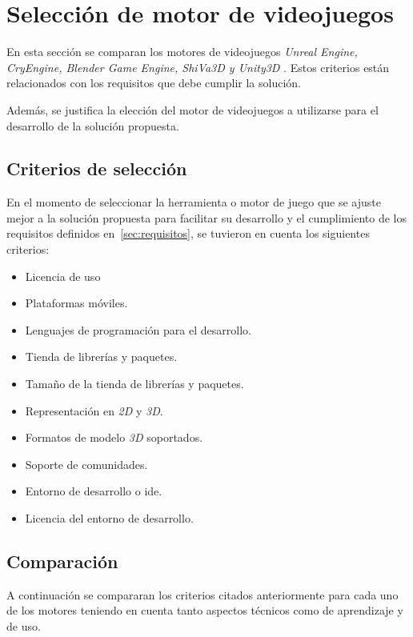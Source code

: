 \section{Selección de motor de videojuegos}
\label{sec:seleccion_plataforma}

En esta sección se comparan los motores de videojuegos \textit{Unreal Engine,
    CryEngine, Blender Game Engine, ShiVa3D y Unity3D} . Estos criterios están relacionados con los requisitos que debe
cumplir la solución.

Además, se justifica la elección del motor de videojuegos a utilizarse para 
el desarrollo de la solución propuesta.

\subsection{Criterios de selección}

En el momento de seleccionar la herramienta o motor de juego que se ajuste mejor
a la solución propuesta para facilitar su desarrollo y el cumplimiento de los
requisitos definidos en~\ref{sec:requisitos}, se tuvieron en cuenta los
siguientes criterios:

\begin{itemize}
\item Licencia de uso
\item Plataformas móviles.
\item Lenguajes de programación para el desarrollo.
\item Tienda de librerías y paquetes.
\item Tamaño de la tienda de librerías y paquetes.
\item Representación en \textit{2D} y \textit{3D}.
\item Formatos de modelo \textit{3D} soportados.
\item Soporte de comunidades.
\item Entorno de desarrollo o \Gls{ide}.
\item Licencia del entorno de desarrollo.
\end{itemize}


\subsection{Comparación}

A continuación se compararan los criterios citados anteriormente para cada uno de los
motores teniendo en cuenta tanto aspectos técnicos como de aprendizaje y de uso.

